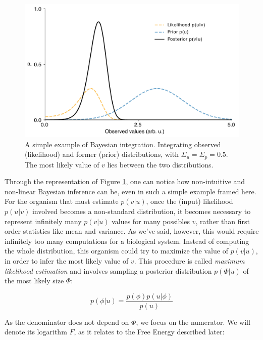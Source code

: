 \begin{figure}[h!tbp]
\vspace{0.5cm}
\centering
\includegraphics[width=.9\textwidth]{fig/chap2_fig_equi_proba.pdf}
\caption[A simple example of Bayesian integration.]{A simple example of Bayesian integration. Integrating observed (likelihood) and former (prior) distributions, with $\Sigma_u = \Sigma_p = 0.5$. The most likely value of $v$ lies between the two distributions.}
\label{fig_chap2_equi_proba}
\end{figure}

Through the representation of Figure \ref{fig_chap2_equi_proba}, one can notice how non-intuitive and non-linear Bayesian inference can be, even in such a simple example framed here. For the organism that must estimate $p(v|u)$, once the (input) likelihood $p(u|v)$ involved becomes a non-standard distribution, it becomes necessary to represent infinitely many $p(v|u)$ values for many possibles $v$, rather than first order statistics like mean and variance. As we've said, however, this would require infinitely too many computations for a biological system. Instead of computing the whole distribution, this organism could try to maximize the value of $p(v|u)$, in order to infer the most likely value of $v$. This procedure is called \textit{maximum likelihood estimation} and involves sampling a posterior distribution $p(\Phi | u)$ of the most likely size $\Phi$:

\begin{equation}
\label{eq_MLE}
p(\phi|u) = \frac{p(\phi)p(u|\phi)}{p(u)}
\end{equation}

As the denominator does not depend on $\Phi$, we focus on the numerator. We will denote its logarithm $F$, as it relates to the Free Energy described later:

